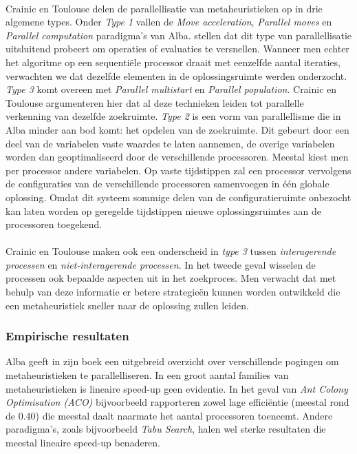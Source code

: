 \paragraph{}
Crainic en Toulouse\cite{crainicAndToulouse} delen de parallellisatie van metaheuristieken op in drie algemene types. Onder \emph{Type 1} vallen de \emph{Move acceleration}, \emph{Parallel moves} en \emph{Parallel computation} paradigma's van Alba. \cite{crainicAndToulouse} stellen dat dit type van parallellisatie uitsluitend probeert om operaties of evaluaties te versnellen. Wanneer men echter het algoritme op een sequenti\"ele processor draait met eenzelfde aantal iteraties, verwachten we dat dezelfde elementen in de oplossingsruimte werden onderzocht. \emph{Type 3} komt overeen met \emph{Parallel multistart} en \emph{Parallel population}. Crainic en Toulouse argumenteren hier dat al deze technieken leiden tot parallelle verkenning van dezelfde zoekruimte. \emph{Type 2} is een vorm van parallellisme die in Alba minder aan bod komt: het opdelen van de zoekruimte. Dit gebeurt door een deel van de variabelen vaste waardes te laten aannemen, de overige variabelen worden dan geoptimaliseerd door de verschillende processoren. Meestal kiest men per processor andere variabelen. Op vaste tijdstippen zal een processor vervolgens de configuraties van de verschillende processoren samenvoegen in \'e\'en globale oplossing. Omdat dit systeem sommige delen van de configuratieruimte onbezocht kan laten worden op geregelde tijdstippen nieuwe oplossingsruimtes aan de processoren toegekend.

\paragraph{}
Crainic en Toulouse maken ook een onderscheid in \emph{type 3} tussen \emph{interagerende processen} en \emph{niet-interagerende processen}. In het tweede geval wisselen de processen ook bepaalde aspecten uit in het zoekproces. Men verwacht dat met behulp van deze informatie er betere strategie\"en kunnen worden ontwikkeld die een metaheuristiek sneller naar de oplossing zullen leiden.

\subsubsection{Empirische resultaten}

Alba geeft in zijn boek een uitgebreid overzicht over verschillende pogingen om metaheuristieken te parallelliseren. In een groot aantal families van metaheuristieken is lineaire speed-up geen evidentie. In het geval van \emph{Ant Colony Optimisation (ACO)} bijvoorbeeld rapporteren zowel \cite{alba8-42,alba8-38,alba8-7,alba8-16} lage effici\"entie (meestal rond de 0.40) die meestal daalt naarmate het aantal processoren toeneemt. Andere paradigma's, zoals bijvoorbeeld \emph{Tabu Search}, halen wel sterke resultaten die meestal lineaire speed-up benaderen.

